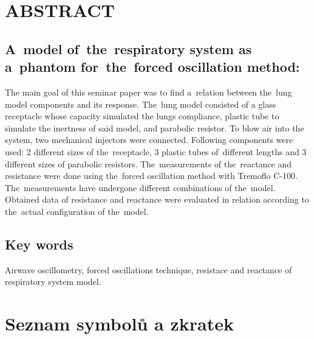 \documentclass[a4paper,12pt]{article}   %
\numberwithin{equation}{section}        %
\newcommand{\nazevENG}{A~model of~the~respiratory system as a~phantom for~the~forced oscillation method}
\begin{document}
		
	\null\vfill	
	\section*{ABSTRACT}
        \subsection*{\nazevENG:}
		 
        The main goal of this seminar paper was to find a~relation between the~lung model components and its response. The~lung model consisted of a glass receptacle whose capacity simulated the lungs compliance, plastic tube to simulate the inertness of said model, and parabolic resistor. To blow air into the system, two mechanical injectors were connected. Following components were used: 2 different sizes of the~receptacle, 3 plastic tubes of~different lengths and 3 different sizes of parabolic resistors. The~measurements of the~reactance and resistance were done using the~forced oscillation method with Tremoflo C-100. The~measurements have undergone different combinations of the~model. Obtained data of resistance and reactance were evaluated in relation according to the~actual configuration of the~model.
    
	\subsection*{Key words}
		Airwave oscillometry, forced oscillations technique, resistace and reactance of respiratory system model.
	\clearpage
	
    \pagestyle{plain}	%
	
	\tableofcontents			%
\clearpage

%

	\section*{Seznam symbolů a zkratek} %
	
	\clearpage
		
	    \listoftables 		%
	
	   \clearpage 			%
		
	  \listoffigures 		%
	  \clearpage
	
\end{document}
